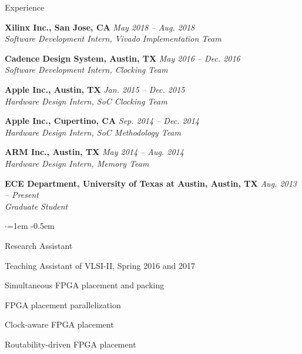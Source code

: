 
\begin{rSection}{Experience}


{\bf Xilinx Inc., San Jose, CA} \hfill {\em May 2018 -- Aug. 2018} \\
\textit{Software Development Intern, Vivado Implementation Team}
    
{\bf Cadence Design System, Austin, TX} \hfill {\em May 2016 -- Dec. 2016} \\
\textit{Software Development Intern, Clocking Team}

{\bf Apple Inc., Austin, TX} \hfill {\em Jan. 2015 -- Dec. 2015} \\
\textit{Hardware Design Intern, SoC Clocking Team}

{\bf Apple Inc., Cupertino, CA} \hfill {\em Sep. 2014 -- Dec. 2014} \\
\textit{Hardware Design Intern, SoC Methodology Team}

{\bf ARM Inc., Austin, TX} \hfill {\em May 2014 -- Aug. 2014} \\
\textit{Hardware Design Intern, Memory Team}

{\bf ECE Department, University of Texas at Austin, Austin, TX} \hfill {\em Aug. 2013 -- Present} \\
\textit{Graduate Student}
\begin{list}{$\cdot$}{\leftmargin=1em} %
\itemsep -0.5em \vspace{-0.5em} %
\item Research Assistant
\item Teaching Assistant of VLSI-II, Spring 2016 and 2017
\item Simultaneous FPGA placement and packing
\item FPGA placement parallelization
\item Clock-aware FPGA placement
\item Routability-driven FPGA placement
\end{list}

\end{rSection}


